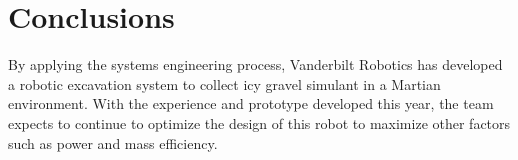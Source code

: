 \documentclass[class=article, crop=false]{standalone}
\begin{document}
	\section{Conclusions}
		By applying the systems engineering process, Vanderbilt Robotics has developed a robotic excavation system to collect icy gravel simulant in a Martian environment. With the experience and prototype developed this year, the team expects to continue to optimize the design of this robot to maximize other factors such as power and mass efficiency.
\end{document}
